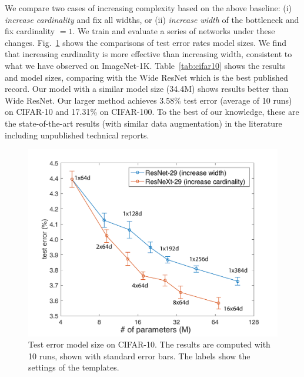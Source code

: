 \documentclass[10pt,twocolumn,letterpaper]{article}
\begin{document}
We compare two cases of increasing complexity based on the above baseline: (i) \emph{increase cardinality} and fix all widths, or (ii) \emph{increase width} of the bottleneck and fix cardinality $=1$.
We train and evaluate a series of networks under these changes.
Fig.~\ref{fig:cifar} shows the comparisons of test error rates \vs model sizes.
We find that increasing cardinality is more effective than increasing width, consistent to what we have observed on ImageNet-1K.
Table~\ref{tab:cifar10} shows the results and model sizes, comparing with the Wide ResNet \cite{Zagoruyko2016a} which is the best published record.
Our model with a similar model size (34.4M) shows results better than Wide ResNet.
Our larger method achieves 3.58\% test error (average of 10 runs)
on CIFAR-10 and 17.31\% on CIFAR-100. To the best of our knowledge, these are the state-of-the-art results (with similar data augmentation) in the literature including unpublished technical reports.

\begin{figure}[t]
\centering
\vspace{-1em}
\includegraphics[width=1.0\linewidth]{figures/cifar/cifar}
\caption{Test error \vs model size on CIFAR-10.
The results are computed with 10 runs, shown with standard error bars. The labels show the settings of the templates.}
\label{fig:cifar}
\end{figure}
\end{document}
